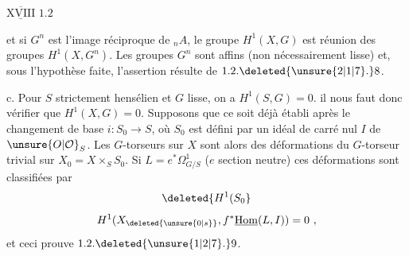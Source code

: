 
 $\underline{\overline{\mathrm{XVIII}}}$ $1.2$ 

et si $G^n$ est l'image réciproque de $ {}_nA$, le groupe $H^1(X,G)$
est réunion des groupes $H^1(X,G^n)$. Les groupes $G^n$ sont
affins (non nécessairement lisse) et, sous l'hypothèse faite,
l'assertion résulte de $1.2.\deleted{\unsure{2|1|7}.}8$.

c. Pour $S$ strictement hensélien et $G$ lisse, on a $H^1(S,G)=0$.
il nous faut donc vérifier que $H^1(X,G)=0$. Supposons que
ce soit déjà établi après le changement de base $i:S_0\longrightarrow S$, où
$S_0$ est défini par un idéal de carré nul  $I$  de $\unsure{O|\mathcal O}_S$. Les
$G$-torseurs sur $X$ sont alors des déformations du $G$-torseur
trivial sur $X_0=X\times_S S_0$. Si $L=e^*\Omega^1_{G/S}$ ($e$ section neutre)
ces déformations sont classifiées par
\[
\deleted{H^1(S_0}
\]
\[
H^1(X_{\deleted{\unsure{0|s}}},f^*\underline{\mathrm{Hom}}(L,I))=0\ ,
\]
et ceci prouve $1.2.\deleted{\unsure{1|2|7}.}9$.

